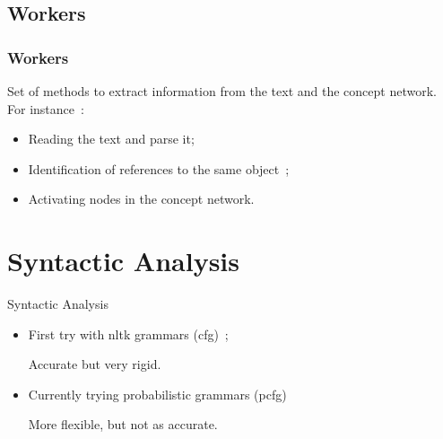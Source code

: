 \documentclass{beamer}
\begin{document}
    \subsection{Workers}
        \begin{frame}
        \frametitle{Workers}
        Set of methods to extract information from the text and the concept network.
        For instance~:
            \begin{itemize}
                \item Reading the text and parse it;
                \item Identification of references to the same object~;
                \item Activating nodes in the concept network.
            \end{itemize}
        \end{frame}

        \section{Syntactic Analysis}
        \begin{frame}{Syntactic Analysis}
          \begin{itemize}
            \item First try with nltk grammars (cfg)~;

              Accurate but very rigid.
            \item Currently trying probabilistic grammars (pcfg)

              More flexible, but not as accurate.
         \end{itemize} 
       \end{frame} 
\end{document}

